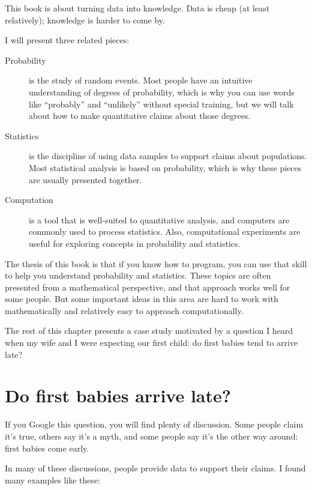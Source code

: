 \documentclass[12pt]{book}
\begin{document}
This book is about turning data into knowledge.  Data is cheap (at
least relatively); knowledge is harder to come by.

I will present three related pieces:

\begin{description}

\item[Probability] is the study of random events.  Most people have an
  intuitive understanding of degrees of probability, which is why you
  can use words like ``probably'' and ``unlikely'' without special
  training, but we will talk about how to make quantitative claims
  about those degrees.

\item[Statistics] is the discipline of using data samples to support
  claims about populations.  Most statistical analysis is based on
  probability, which is why these pieces are usually presented
  together.

\item[Computation] is a tool that is well-suited to quantitative
  analysis, and computers are commonly used to process statistics.
  Also, computational experiments
  are useful for exploring concepts in probability and statistics.

\end{description}

The thesis of this book is that if you know how to program, you can
use that skill to help you understand probability and statistics.
These topics are often presented from a mathematical perspective, and
that approach works well for some people.  But some important ideas
in this area are hard to work with mathematically and relatively
easy to approach computationally.

The rest of this chapter presents a case study motivated by a question
I heard when my wife and I were expecting our first child: do first
babies tend to arrive late?

\section{Do first babies arrive late?}

If you Google this question, you will find plenty of discussion.
Some people claim it's true, others say it's a myth, and some people
say it's the other way around: first babies come early.

In many of these discussions, people provide data to support their
claims.  I found many examples like these:
\end{document}
